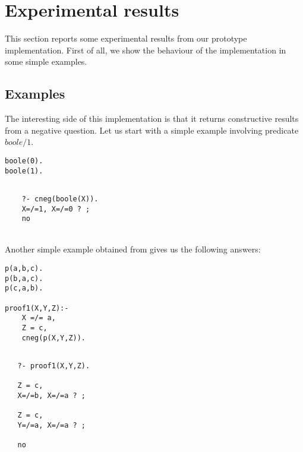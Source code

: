 \documentclass{llncs}
\begin{document}
\section{Experimental results}
\label{results}
This section reports some experimental results from our prototype
implementation.  First of all, we show the behaviour of the
implementation in some simple examples.


\subsection{Examples}
\label{examples}

The interesting side of this implementation is that it returns
constructive results from a negative question. Let us start with a
simple example involving predicate $boole/1$.

\begin{minipage}{2in}
\begin{verbatim}
boole(0).
boole(1).
\end{verbatim}
\end{minipage}
\begin{minipage}{2in}
\begin{verbatim} 

    ?- cneg(boole(X)).
    X=/=1, X=/=0 ? ;
    no
\end{verbatim} 
\end{minipage}\\

Another simple example obtained from \cite{Stuckey95} gives us the
following answers:

\begin{minipage}{2in}
\begin{verbatim}
p(a,b,c).
p(b,a,c).
p(c,a,b).

proof1(X,Y,Z):-
    X =/= a,
    Z = c,
    cneg(p(X,Y,Z)).
\end{verbatim}
\end{minipage}
\begin{minipage}{2in}
\begin{verbatim} 

   ?- proof1(X,Y,Z).

   Z = c,
   X=/=b, X=/=a ? ;

   Z = c,
   Y=/=a, X=/=a ? ;

   no
\end{verbatim} 
\end{minipage}\\
\end{document}
